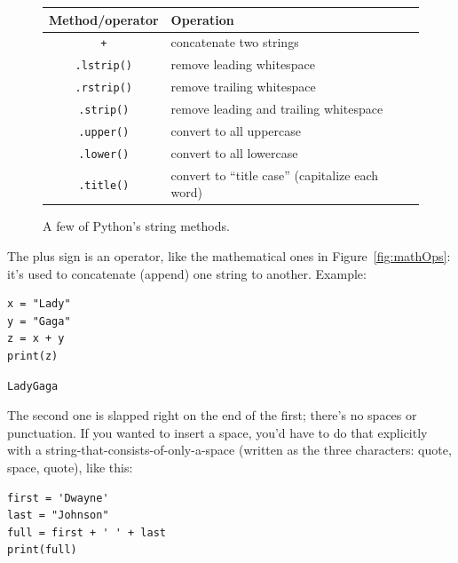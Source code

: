 
\begin{figure}[ht]
\small
\centering
\begin{tabular}{c | l}
\hline
Method/operator & Operation \\
\hline
\texttt{+} & concatenate two strings \\
\texttt{.lstrip()} & remove leading whitespace \\
\texttt{.rstrip()} & remove trailing whitespace \\
\texttt{.strip()} & remove leading and trailing whitespace \\
\texttt{.upper()} & convert to all uppercase \\
\texttt{.lower()} & convert to all lowercase \\
\texttt{.title()} & convert to ``title case'' (capitalize each word) \\
\hline
\end{tabular}
\smallskip
\caption{A few of Python's string methods.}
\label{fig:stringOps}
\end{figure}

The plus sign is an operator, like the mathematical ones in
Figure~\ref{fig:mathOps}: it's used to concatenate (append) one string to
another. Example:

\begin{Verbatim}[fontsize=\small,samepage=true,frame=single,framesep=3mm]
x = "Lady"
y = "Gaga"
z = x + y
print(z)
\end{Verbatim}

\begin{Verbatim}[fontsize=\small,samepage=true,frame=leftline,framesep=5mm,framerule=1mm]
LadyGaga
\end{Verbatim}

The second one is slapped right on the end of the first; there's no spaces or
punctuation. If you wanted to insert a space, you'd have to do that explicitly
with a string-that-consists-of-only-a-space (written as the three characters:
quote, space, quote), like this:

\begin{Verbatim}[fontsize=\small,samepage=true,frame=single,framesep=3mm]
first = 'Dwayne'
last = "Johnson"
full = first + ' ' + last
print(full)
\end{Verbatim}

